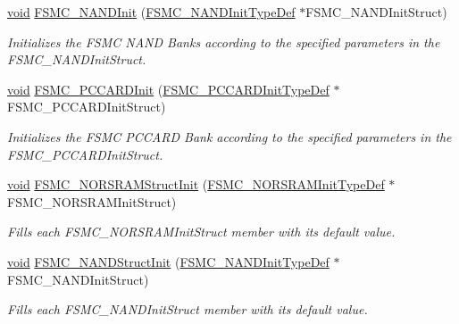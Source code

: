 \begin{DoxyCompactItemize}
\hyperlink{usb__devapi_8h_afabf60e7f57651d6d595a02c75f07cd0}{void} \hyperlink{group___f_s_m_c___exported___functions_ga9f81ccc4e126c11f1eb33077b1a68e6f}{F\+S\+M\+C\+\_\+\+N\+A\+N\+D\+Init} (\hyperlink{struct_f_s_m_c___n_a_n_d_init_type_def}{F\+S\+M\+C\+\_\+\+N\+A\+N\+D\+Init\+Type\+Def} $\ast$F\+S\+M\+C\+\_\+\+N\+A\+N\+D\+Init\+Struct)
\begin{DoxyCompactList}\small\item\em Initializes the F\+S\+MC N\+A\+ND Banks according to the specified parameters in the F\+S\+M\+C\+\_\+\+N\+A\+N\+D\+Init\+Struct. \end{DoxyCompactList}\item 
\hyperlink{usb__devapi_8h_afabf60e7f57651d6d595a02c75f07cd0}{void} \hyperlink{group___f_s_m_c___exported___functions_gacee1351363e7700a296faa1734a910aa}{F\+S\+M\+C\+\_\+\+P\+C\+C\+A\+R\+D\+Init} (\hyperlink{struct_f_s_m_c___p_c_c_a_r_d_init_type_def}{F\+S\+M\+C\+\_\+\+P\+C\+C\+A\+R\+D\+Init\+Type\+Def} $\ast$F\+S\+M\+C\+\_\+\+P\+C\+C\+A\+R\+D\+Init\+Struct)
\begin{DoxyCompactList}\small\item\em Initializes the F\+S\+MC P\+C\+C\+A\+RD Bank according to the specified parameters in the F\+S\+M\+C\+\_\+\+P\+C\+C\+A\+R\+D\+Init\+Struct. \end{DoxyCompactList}\item 
\hyperlink{usb__devapi_8h_afabf60e7f57651d6d595a02c75f07cd0}{void} \hyperlink{group___f_s_m_c___exported___functions_gaf33e6dfc34f62d16a0cb416de9e83d28}{F\+S\+M\+C\+\_\+\+N\+O\+R\+S\+R\+A\+M\+Struct\+Init} (\hyperlink{struct_f_s_m_c___n_o_r_s_r_a_m_init_type_def}{F\+S\+M\+C\+\_\+\+N\+O\+R\+S\+R\+A\+M\+Init\+Type\+Def} $\ast$F\+S\+M\+C\+\_\+\+N\+O\+R\+S\+R\+A\+M\+Init\+Struct)
\begin{DoxyCompactList}\small\item\em Fills each F\+S\+M\+C\+\_\+\+N\+O\+R\+S\+R\+A\+M\+Init\+Struct member with its default value. \end{DoxyCompactList}\item 
\hyperlink{usb__devapi_8h_afabf60e7f57651d6d595a02c75f07cd0}{void} \hyperlink{group___f_s_m_c___exported___functions_ga8283ad94ad8e83d49d5b77d1c7e17862}{F\+S\+M\+C\+\_\+\+N\+A\+N\+D\+Struct\+Init} (\hyperlink{struct_f_s_m_c___n_a_n_d_init_type_def}{F\+S\+M\+C\+\_\+\+N\+A\+N\+D\+Init\+Type\+Def} $\ast$F\+S\+M\+C\+\_\+\+N\+A\+N\+D\+Init\+Struct)
\begin{DoxyCompactList}\small\item\em Fills each F\+S\+M\+C\+\_\+\+N\+A\+N\+D\+Init\+Struct member with its default value. \end{DoxyCompactList}\item 

\end{DoxyCompactItemize}
